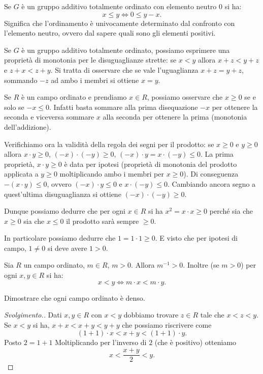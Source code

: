 Se $G$ è un gruppo additivo totalmente ordinato con elemento neutro $0$ si ha:
\[
  x\le y  \iff 0 \le y-x.
\]
Significa che l'ordinamento è univocamente determinato 
dal confronto con l'elemento neutro, ovvero dal sapere 
quali sono gli elementi positivi.

Se $G$ è un gruppo additivo totalmente ordinato, possiamo esprimere una proprietà di monotonia 
per le disuguaglianze strette: se $x<y$ allora $x+z<y+z$ e $z+x<z+y$.
Si tratta di osservare che se vale l'uguaglianza $x+z=y+z$,
sommando $-z$ ad ambo i membri si ottiene $x=y$.

Se $R$ è un campo ordinato e prendiamo $x\in R$, 
possiamo osservare che $x\ge 0$ se e solo se $-x\le 0$. 
Infatti basta sommare alla prima disequazione $-x$
per ottenere la seconda e viceversa sommare $x$ alla seconda per 
ottenere la prima (monotonia dell'addizione).

Verifichiamo ora la validità della regola dei segni per il prodotto:
se $x\ge 0$ e $y\ge 0$ allora $x\cdot y \ge 0$,
$(-x)\cdot (-y) \ge 0$, $(-x)\cdot y = x \cdot (-y) \le 0$.
La prima proprietà, $x\cdot y\ge 0$ è data per ipotesi (proprietà di monotonia 
del prodotto applicata a $y\ge 0$ moltiplicando ambo i membri per $x\ge 0$).
Di conseguenza $-(x\cdot y)\le 0$, ovvero $(-x)\cdot y \le 0$ 
e $x\cdot (-y) \le 0$. 
Cambiando ancora segno a quest'ultima disuguaglianza si ottiene $(-x)\cdot(-y)\ge 0$.

Dunque possiamo dedurre che per ogni $x\in R$ si ha $x^2=x\cdot x\ge 0$
perché sia che $x\ge 0$ sia che $x\le 0$ il prodotto sarà sempre $\ge 0$.

In particolare possiamo dedurre che $1=1\cdot 1\ge 0$. 
E visto che per ipotesi di campo, $1\neq 0$ si deve avere $1>0$.

\begin{exercise}
Sia $R$ un campo ordinato, $m\in R$, $m>0$.
Allora $m^{-1}>0$.
Inoltre (se $m>0$) per ogni $x,y\in R$ si ha:
\[
  x<y \iff m\cdot x < m\cdot y.
\]
\end{exercise}

\begin{exercise}
Dimostrare che ogni campo ordinato è denso.
\end{exercise}
\begin{proof}[Svolgimento.]
Dati $x,y\in R$ con $x<y$ dobbiamo trovare $z\in R$ tale che $x<z<y$.
Se $x<y$ si ha, $x+x<x+y<y+y$ che possiamo riscrivere come
\[
(1+1)\cdot x < x+y < (1+1)\cdot y.
\]
Posto $2=1+1$ 
Moltiplicando per l'inverso di $2$ 
(che è positivo) otteniamo
\[
x < \frac{x+y}{2} < y.
\]
\end{proof}


